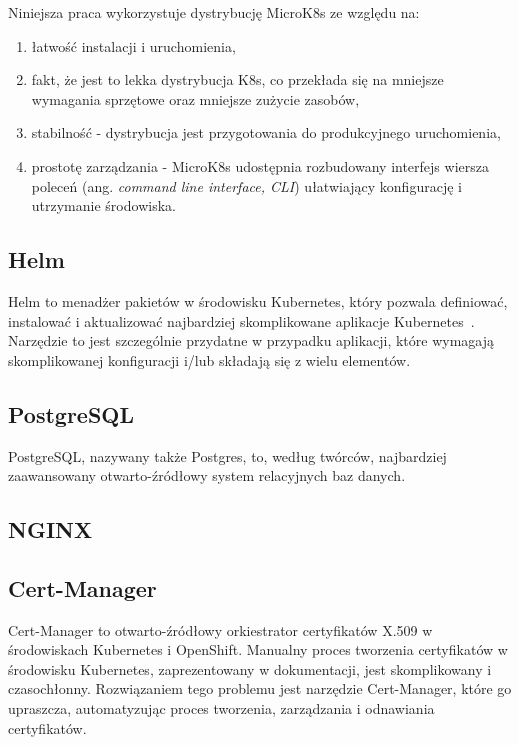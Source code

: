 Niniejsza praca wykorzystuje dystrybucję MicroK8s\cite{microk8s-docs-home} ze względu na:
\begin{enumerate}
    \item łatwość instalacji i uruchomienia,
    \item fakt, że jest to lekka dystrybucja K8s, co przekłada się na mniejsze wymagania sprzętowe oraz mniejsze zużycie zasobów,
    \item stabilność - dystrybucja jest przygotowania do produkcyjnego uruchomienia,
    \item prostotę zarządzania - MicroK8s udostępnia rozbudowany interfejs wiersza poleceń (ang. \emph{command line interface, CLI}) ułatwiający konfigurację i utrzymanie środowiska.
\end{enumerate}

\subsection{Helm}\label{subsec:helm}

Helm to menadżer pakietów w środowisku Kubernetes, który pozwala definiować, instalować i aktualizować najbardziej skomplikowane aplikacje Kubernetes~\cite{helm-home}.
Narzędzie to jest szczególnie przydatne w przypadku aplikacji, które wymagają skomplikowanej konfiguracji i/lub składają się z wielu elementów.

\subsection{PostgreSQL}\label{subsec:postgresql}

PostgreSQL, nazywany także Postgres, to, według twórców, najbardziej zaawansowany otwarto-źródłowy system relacyjnych baz danych\cite{postgresql-home}.

\subsection{NGINX}\label{subsec:nginx}

 

\subsection{Cert-Manager}\label{subsec:cert-manager}

Cert-Manager to otwarto-źródłowy orkiestrator certyfikatów X.509 w środowiskach Kubernetes i OpenShift\cite{cert-manager-home}.
Manualny proces tworzenia certyfikatów w środowisku Kubernetes, zaprezentowany w dokumentacji\cite{kubernetes-generate-certificates-manually}, jest skomplikowany i czasochłonny.
Rozwiązaniem tego problemu jest narzędzie Cert-Manager, które go upraszcza, automatyzując proces tworzenia, zarządzania i odnawiania certyfikatów.

